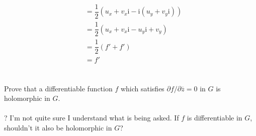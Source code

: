 \begin{enumerate}
\begin{align*}
&= \dfrac{1}{2}\left(u_x + v_x\mathrm{i} - \mathrm{i}(u_y + v_y\mathrm{i})\right) \\
&= \dfrac{1}{2}\left(u_x + v_x\mathrm{i} - u_y\mathrm{i} + v_y\right) \\
&= \dfrac{1}{2}\left(f' + f'\right) \\
&= f'
\end{align*}
\\\\
Prove that a differentiable function $f$ which satisfies $\partial f/\partial \overline{z} = 0$ in $G$ is holomorphic in $G$. \\\\
? I'm not quite sure I understand what is being asked. If $f$ is differentiable in $G$, shouldn't it also be holomorphic in $G$? 
\end{enumerate}